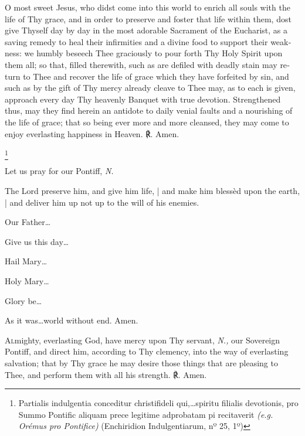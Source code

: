 \documentclass[11pt]{article}
\begin{document}
\begin{otherlanguage}{english}{\par}


\lettrine{O}{} most sweet Jesus, who didst come into this world to enrich all souls with the life of Thy grace, and in order to preserve and foster that life within them, dost give Thyself day by day in the most adorable Sacrament of the Eucharist, as a saving remedy to heal their infirmities and a divine food to support their weakness: we humbly beseech Thee graciously to pour forth Thy Holy Spirit upon them all; so that, filled therewith, such as are defiled with deadly stain may return to Thee and recover the life of grace which they have forfeited by sin, and such as by the gift of Thy mercy already cleave to Thee may, as to each is given, approach every day Thy heavenly Banquet with true devotion. Strengthened thus, may they find herein an antidote to daily venial faults and a nourishing of the life of grace; that so being ever more and more cleansed, they may come to enjoy everlasting happiness in Heaven. ℟. Amen.

\footnote{\raggedright{Partialis indulgentia conceditur christifideli qui,…spiritu filialis devotionis, pro Summo Pontific aliquam prece legitime adprobatam pi recitaverit \textit{(e.g. Orémus pro Pontifice)} (Enchiridion Indulgentiarum, nº 25, 1º)}}

\noindent \vv Let us pray for our Pontiff, \textit{N.}

\noindent \rr The Lord preserve him, and give him life, | and make him blessèd upon the earth, | and deliver him up not up to the will of his enemies.

\noindent \vv Our Father…

\noindent \rr Give us this day…

\noindent \vv Hail Mary…

\noindent \rr Holy Mary…

\noindent \vv  Glory be…

\noindent \rr As it was…world without end. Amen.


\lettrine{A}{l}mighty, everlasting God, have mercy upon Thy servant, \textit{N.,} our Sovereign Pontiff, and direct him, according to Thy clemency, into the way of everlasting salvation; that by Thy grace he may desire those things that are pleasing to Thee, and perform them with all his strength. ℟. Amen.


\end{otherlanguage}
\end{document}
